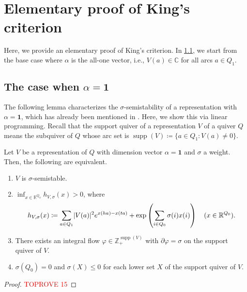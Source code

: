 \documentclass[a4paper,11pt]{article}
\numberwithin{equation}{section}
\newcommand{\C}{\mathbb{C}}
\newcommand{\R}{\mathbb{R}}
\newcommand{\Z}{\mathbb{Z}}
\newcommand{\ones}{\mathbf{1}}
\DeclareMathOperator{\supp}{supp}
\DeclarePairedDelimiter{\abs}{\lvert}{\rvert}
\begin{document}
\printbibliography

\newpage
\appendix
\section{Elementary proof of King's criterion}\label{sec:King}
Here, we provide an elementary proof of King's criterion.
In \cref{sec:king-ones}, we start from the base case where $\alpha$ is the all-one vector, i.e., $V(a) \in \C$ for all arcs $a \in Q_1$.

\subsection{The case when $\alpha = \ones$}\label{sec:king-ones}

The following lemma characterizes the $\sigma$-semistability of a representation with $\alpha = \ones$, which has already been mentioned in .
Here, we show this via linear programming.
Recall that the support quiver of a representation $V$ of a quiver $Q$ means the subquiver of $Q$ whose arc set is $\supp(V) \coloneqq \{a \in Q_1 : V(a) \ne 0\}$.

\begin{lemma}\label{lem:1d-King}
    Let $V$ be a representation of $Q$ with dimension vector $\alpha = \ones$ and $\sigma$ a weight.
    Then, the following are equivalent.
    \begin{enumerate}[{label={\textup{(\arabic*)}}}]
        \item $V$ is $\sigma$-semistable.
        \item $\inf_{x \in \R^{Q_0}} h_{V, \sigma}(x) > 0$, where
            \begin{align}\label{def:f_V}
               h_{V, \sigma}(x) \coloneqq \sum_{a \in Q_1} \abs{V(a)}^2 e^{x(ha) - x(ta)} + \exp\left(\sum_{i \in Q_0}\sigma(i)x(i) \right) \quad (x \in \R^{Q_0}).
            \end{align}
        \item There exists an integral flow $\varphi \in \Z_+^{\supp(V)}$ with $\partial\varphi = \sigma$ on the support quiver of $V$.
        \item $\sigma(Q_0)=0$ and $\sigma(X) \leq 0$ for each lower set $X$ of the support quiver of $V$.
    \end{enumerate}
\end{lemma}
\begin{proof}\textcolor{red}{TOPROVE 15}\end{proof}
\end{document}
